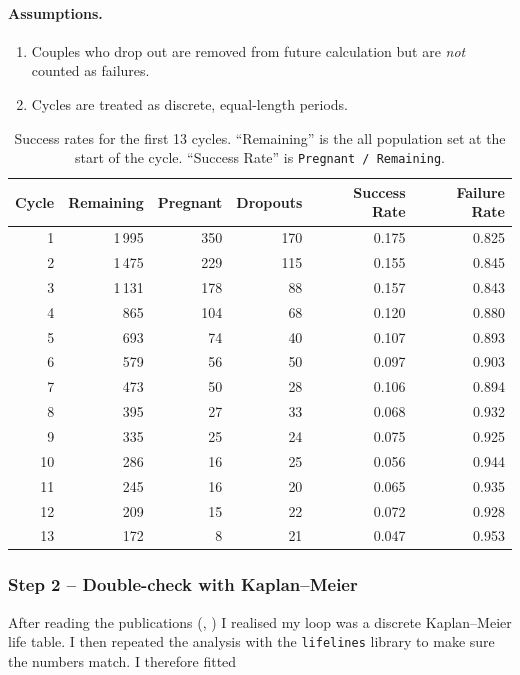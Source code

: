 \documentclass[11pt,a4paper]{article}
\begin{document}
\paragraph{Assumptions.}
\begin{enumerate}
  \item Couples who drop out are removed from future calculation but are \emph{not} counted as failures.
  \item Cycles are treated as discrete, equal-length periods.
\end{enumerate}

\begin{table}[htbp]
  \centering
  \caption{Success rates for the first 13 cycles.  “Remaining” is the all population set at the
  start of the cycle.  “Success Rate” is \texttt{Pregnant / Remaining}.}
  \label{tab:probtable}
  \begin{tabular}{rrrrrr}
    \toprule
    Cycle & Remaining & Pregnant & Dropouts & Success Rate & Failure Rate \\
    \midrule
     1 & 1\,995 & 350 & 170 & 0.175 & 0.825 \\
     2 & 1\,475 & 229 & 115 & 0.155 & 0.845 \\
     3 & 1\,131 & 178 &  88 & 0.157 & 0.843 \\
     4 &   865 & 104 &  68 & 0.120 & 0.880 \\
     5 &   693 &  74 &  40 & 0.107 & 0.893 \\
     6 &   579 &  56 &  50 & 0.097 & 0.903 \\
     7 &   473 &  50 &  28 & 0.106 & 0.894 \\
     8 &   395 &  27 &  33 & 0.068 & 0.932 \\
     9 &   335 &  25 &  24 & 0.075 & 0.925 \\
    10 &   286 &  16 &  25 & 0.056 & 0.944 \\
    11 &   245 &  16 &  20 & 0.065 & 0.935 \\
    12 &   209 &  15 &  22 & 0.072 & 0.928 \\
    13 &   172 &   8 &  21 & 0.047 & 0.953 \\
    \bottomrule
  \end{tabular}
\end{table}

\subsubsection{Step 2 – Double-check with Kaplan–Meier}
After reading the publications (\cite{benhar2024}, \cite{pearson2020}) I realised my loop was a discrete Kaplan–Meier life table.  
I then repeated the analysis with the \texttt{lifelines} library to make sure the numbers match.  
I therefore fitted
\end{document}

